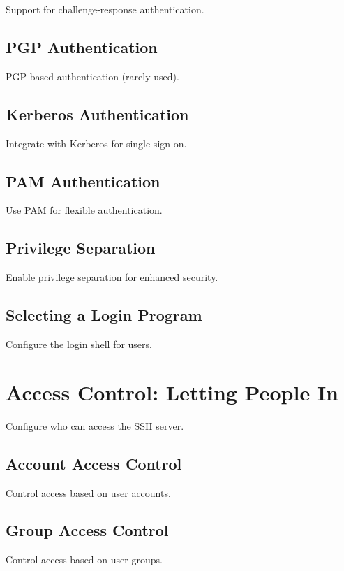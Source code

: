 \documentclass[12pt]{book}
\begin{document}
Support for challenge-response authentication.

\subsection{PGP Authentication}

PGP-based authentication (rarely used).

\subsection{Kerberos Authentication}

Integrate with Kerberos for single sign-on.

\subsection{PAM Authentication}

Use PAM for flexible authentication.

\subsection{Privilege Separation}

Enable privilege separation for enhanced security.

\subsection{Selecting a Login Program}

Configure the login shell for users.

\section{Access Control: Letting People In}

Configure who can access the SSH server.

\subsection{Account Access Control}

Control access based on user accounts.

\subsection{Group Access Control}

Control access based on user groups.
\end{document}
